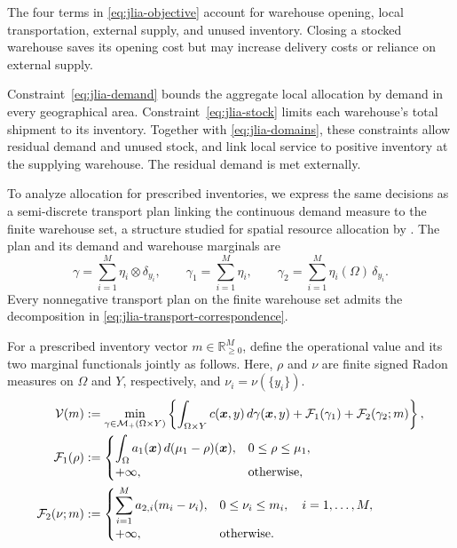 \documentclass[a4paper,fleqn]{cas-sc}
\theoremstyle{remark}
\theoremstyle{plain}
\begin{document}
The four terms in \eqref{eq:jlia-objective} account for warehouse opening, local transportation, external supply, and unused inventory. Closing a stocked warehouse saves its opening cost but may increase delivery costs or reliance on external supply.

Constraint~\eqref{eq:jlia-demand} bounds the aggregate local allocation by demand in every geographical area. Constraint~\eqref{eq:jlia-stock} limits each warehouse's total shipment to its inventory. Together with \eqref{eq:jlia-domains}, these constraints allow residual demand and unused stock, and link local service to positive inventory at the supplying warehouse. The residual demand is met externally.

To analyze allocation for prescribed inventories, we express the same decisions as a semi-discrete transport plan linking the continuous demand measure to the finite warehouse set, a structure studied for spatial resource allocation by \citet{chungunbalanced}. The plan and its demand and warehouse marginals are
\begin{equation}\label{eq:jlia-transport-correspondence}
    \gamma=\sum_{i=1}^M\eta_i\otimes\delta_{y_i},\qquad
    \gamma_1=\sum_{i=1}^M\eta_i,\qquad
    \gamma_2=\sum_{i=1}^M\eta_i(\Omega)\,\delta_{y_i}.
\end{equation}
Every nonnegative transport plan on the finite warehouse set admits the decomposition in \eqref{eq:jlia-transport-correspondence}.

For a prescribed inventory vector $m\in\mathbb R_{\ge0}^M$, define the operational value and its two marginal functionals jointly as follows. Here, $\rho$ and $\nu$ are finite signed Radon measures on $\Omega$ and $Y$, respectively, and $\nu_i=\nu(\{y_i\})$.
\begin{subequations}\label{eq:jlia-operational-uot}
\allowdisplaybreaks[0]
\begin{align}
    \mathcal V(m)&:=\min_{\gamma\in\mathcal M_+(\Omega\times Y)}
    \left\{\int_{\Omega\times Y}c(\bm x,y)\,d\gamma(\bm x,y)+\mathcal F_1(\gamma_1)+\mathcal F_2(\gamma_2;m)\right\},
    \label{eq:jlia-operational-value}\\
    \mathcal F_1(\rho)&:=
    \begin{cases}
        \displaystyle\int_\Omega a_1(\bm x)\,d(\mu_1-\rho)(\bm x),&0\le\rho\le\mu_1,\\
        +\infty,&\text{otherwise},
    \end{cases}
    \label{eq:jlia-demand-functional}\\
    \mathcal F_2(\nu;m)&:=
    \begin{cases}
        \displaystyle\sum_{i=1}^M a_{2,i}(m_i-\nu_i),&0\le\nu_i\le m_i,\quad i=1,\ldots,M,\\
        +\infty,&\text{otherwise}.
    \end{cases}
    \label{eq:jlia-inventory-functional}
\end{align}
\end{subequations}
\end{document}
